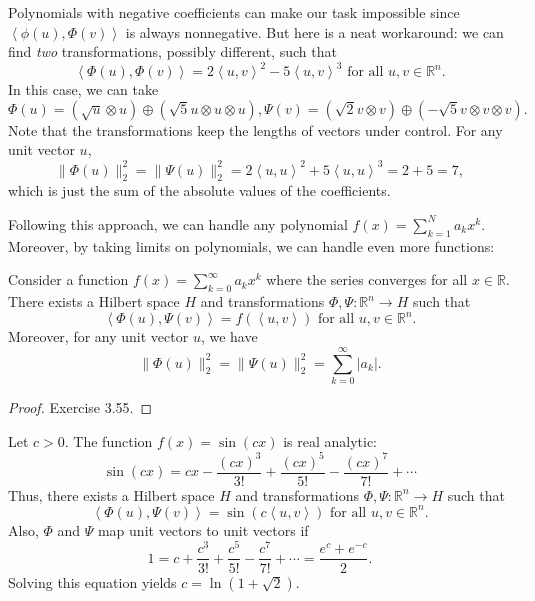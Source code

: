 \begin{example}
\label{ex:3.7.6}
Polynomials with negative coefficients can make our task impossible since $\left\langle \phi(u), 
\Phi(v) \right\rangle$ is always nonnegative. But here is a neat workaround: we can find \textit{two} 
transformations, possibly different, such that 
\[ \left\langle \Phi(u), \Phi(v) \right\rangle = 2 \left\langle u, v \right\rangle^2 
- 5 \left\langle u, v \right\rangle^3 \text{ for all } u, v \in \mathbb{R}^n. \]
In this case, we can take 
\[ \Phi(u) = (\sqrt{u} \otimes u) \oplus (\sqrt{5}u \otimes u \otimes u), 
\Psi(v) = (\sqrt{2}v \otimes v) \oplus (-\sqrt{5}v \otimes v \otimes v). \]
Note that the transformations keep the lengths of vectors under control. For any unit vector $u$, 
\[ \lVert \Phi(u) \rVert_{2}^2 = \lVert \Psi(u) \rVert_{2}^2 
= 2 \left\langle u, u \right\rangle^2 + 5 \left\langle u, u \right\rangle^3 = 2 + 5 = 7, \]
which is just the sum of the absolute values of the coefficients.
\end{example}

Following this approach, we can handle any polynomial $f(x) = \sum_{k = 1}^{N} a_k x^k$. Moreover, by taking 
limits on polynomials, we can handle even more functions:

\begin{lemma}
\label{lem:3.7.7}
Consider a function $f(x) = \sum_{k = 0}^{\infty} a_kx^k$ where the series converges for all $x \in 
\mathbb{R}$. There exists a Hilbert space $H$ and transformations $\Phi, \Psi: \mathbb{R}^n \to H$ such that 
\[ \left\langle \Phi(u), \Psi(v) \right\rangle = f(\left\langle u, v \right\rangle) \text{ for all } 
u, v \in \mathbb{R}^n. \]
Moreover, for any unit vector $u$, we have 
\[ \lVert \Phi(u) \rVert_{2}^2 = \lVert \Psi(u) \rVert_{2}^2 = \sum_{k = 0}^{\infty}|a_k|. \]
\end{lemma}

\begin{proof}
Exercise 3.55.
\end{proof}

\begin{example}
\label{ex:3.7.8}
Let $c > 0$. The function $f(x) = \sin{(cx)}$ is real analytic: 
\[ \sin{(cx)} = cx - \frac{(cx)^3}{3!} + \frac{(cx)^5}{5!} - \frac{(cx)^7}{7!} + \cdots \]
Thus, there exists a Hilbert space $H$ and transformations $\Phi, \Psi: \mathbb{R}^n \to H$ such that 
\[ \left\langle \Phi(u), \Psi(v) \right\rangle = \sin{(c \left\langle u, v \right\rangle )} 
\text{ for all } u, v \in \mathbb{R}^n. \]
Also, $\Phi$ and $\Psi$ map unit vectors to unit vectors if 
\[ 1 = c + \frac{c^3}{3!} + \frac{c^5}{5!} - \frac{c^7}{7!} + \cdots = \frac{e^c + e^{-c}}{2}. \]
Solving this equation yields $c = \ln{(1 + \sqrt{2})}$.
\end{example}


